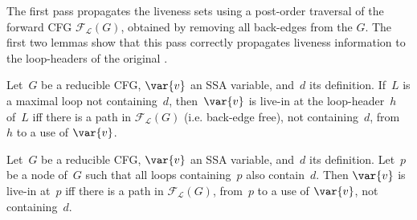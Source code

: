 

The first pass propagates the liveness sets using a post-order traversal of the forward CFG $\mathcal{F}_\mathcal{L}(G)$, obtained by removing all back-edges from the \@CFG $G$.
The first two lemmas show that this pass correctly propagates liveness information to the loop-headers of the original \@CFG.
\begin{lemma}
	\label{lemma:firstpass}
	Let~$G$ be a reducible CFG, $\var{v}$ an SSA variable, and~$d$ its definition.
	If~$L$ is a maximal loop not containing~$d$, then~$\var{v}$ is live-in at the loop-header~$h$ of~$L$ iff there is a path in $\mathcal{F}_\mathcal{L}(G)$ (i.e. back-edge free), not containing~$d$, from~$h$ to a use of $\var{v}$.
\end{lemma}

\begin{lemma}
	\label{lemma:firstpass2}
	Let~$G$ be a reducible CFG, $\var{v}$ an SSA variable, and~$d$ its definition.
	Let~$p$ be a node of~$G$ such that all loops containing~$p$ also contain~$d$.
	Then $\var{v}$ is live-in at~$p$ iff there is a path in $\mathcal{F}_\mathcal{L}(G)$, from~$p$ to a use of $\var{v}$, not containing~$d$.
\end{lemma}

